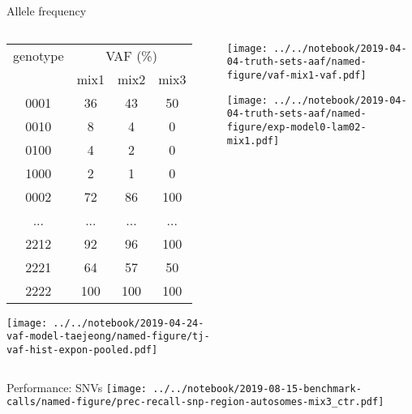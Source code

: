 \documentclass{beamer}
\begin{document}
\begin{frame}{Allele frequency}
\begin{columns}[t]
\begin{column}{0.5\textwidth}

{\tiny
\begin{tabular}{c|ccc}
genotype & \multicolumn{3}{c}{VAF (\%)} \\
& mix1 &  mix2 & mix3 \\
\hline
0001 & 36 & 43 & 50\\
0010 & 8 & 4 & 0\\
0100 & 4 & 2 & 0\\
1000 & 2 & 1 & 0\\
0002 & 72 & 86 & 100\\
... & ... & ... & ...\\
2212 & 92 & 96 & 100\\
2221 & 64 & 57 & 50\\
2222 & 100 & 100 & 100\\
\end{tabular}
}

\texttt{[image: ../../notebook/2019-04-24-vaf-model-taejeong/named-figure/tj-vaf-hist-expon-pooled.pdf]}

\end{column}

\begin{column}{0.5\textwidth}

\texttt{[image: ../../notebook/2019-04-04-truth-sets-aaf/named-figure/vaf-mix1-vaf.pdf]}

\texttt{[image: ../../notebook/2019-04-04-truth-sets-aaf/named-figure/exp-model0-lam02-mix1.pdf]}
\end{column}
\end{columns}
\end{frame}

\begin{frame}{Performance: SNVs}
\texttt{[image: ../../notebook/2019-08-15-benchmark-calls/named-figure/prec-recall-snp-region-autosomes-mix3\_ctr.pdf]}
\end{frame}
\end{document}
